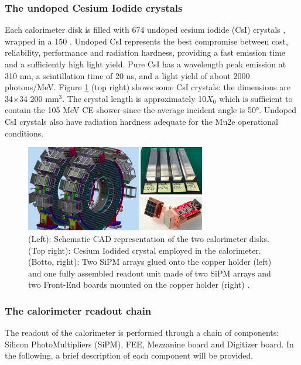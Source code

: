 \subsubsection{The undoped Cesium Iodide crystals}
Each calorimeter disk is filled with 674 undoped cesium 
iodide (CsI) crystals \cite{em6}, wrapped in a 150  . 
Undoped CsI represents the best compromise between cost, 
reliability, performance and radiation hardness, providing 
a fast emission time and a sufficiently high light yield. Pure 
CsI has a wavelength peak emission at 310 nm,  a scintillation 
time of 20 ns, and a light yield of about 2000 photons/MeV. 
Figure \ref{fig:calo2} (top right) shows some CsI crystals: 
the dimensions are 34$\times$34 200 mm$^3$. The crystal length 
is approximately 10$X_0$ which is sufficient to contain the 105 
MeV CE shower since the average incident angle 
is 50°. Undoped CsI crystals also have  radiation hardness 
adequate for the Mu2e operational conditions. 




\begin{figure}[!h]
    \centering
    \includegraphics[width =0.7\textwidth]{figures/png/Screenshot_20240322_121000.png}
    \caption[The calorimeter components.]{(Left): Schematic CAD representation of the two calorimeter disks. (Top right): 
    Cesium Iodided crystal employed in the calorimeter. (Botto, right): Two SiPM arrays 
    glued onto the copper holder (left) and one fully assembled readout unit made of two 
    SiPM arrays and two Front-End boards mounted on the copper holder (right) \cite{em4}.}
    \label{fig:calo2}
\end{figure}


\subsubsection{The calorimeter readout chain}
The readout of the calorimeter is performed through a chain of components: Silicon PhotoMultipliers (SiPM), 
FEE, Mezzanine board and Digitizer board. In the following, 
a brief description of each component will be provided.
